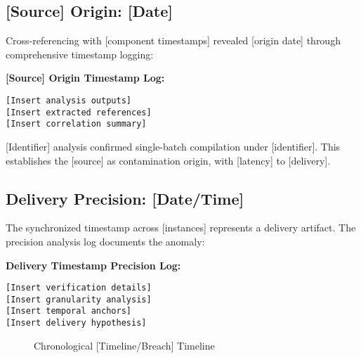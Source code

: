 \documentclass[12pt,a4paper]{article}
\begin{document}
\subsection{[Source] Origin: [Date]}
Cross-referencing with [component timestamps] revealed [origin date] through comprehensive timestamp logging:

\textbf{[Source] Origin Timestamp Log:}
\begin{lstlisting}[style=terminal, caption={[Source] Origin Correlation - [Date]}]
[Insert analysis outputs]
[Insert extracted references]
[Insert correlation summary]
\end{lstlisting}

[Identifier] analysis confirmed single-batch compilation under [identifier]. This establishes the [source] as contamination origin, with [latency] to [delivery].

\subsection{Delivery Precision: [Date/Time]}
The synchronized timestamp across [instances] represents a delivery artifact. The precision analysis log documents the anomaly:

\textbf{Delivery Timestamp Precision Log:}
\begin{lstlisting}[style=terminal, caption={[Precision] Timestamp Precision Analysis}]
[Insert verification details]
[Insert granularity analysis]
[Insert temporal anchors]
[Insert delivery hypothesis]
\end{lstlisting}

\begin{figure}[htbp]
\centering
{}
\caption{Chronological [Timeline/Breach] Timeline}
\label{fig:timeline}
\end{figure}
\end{document}
